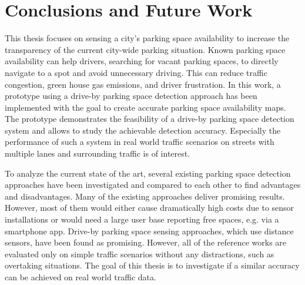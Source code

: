 \chapter{Conclusions and Future Work}
\label{chap:conclusion}



This thesis focuses on sensing a city's parking space availability to increase the transparency of the current city-wide parking situation. 
Known parking space availability can help drivers, searching for vacant parking spaces, to directly navigate to a spot and avoid unnecessary driving. This can reduce traffic congestion, green house gas emissions, and driver frustration. 
In this work, a prototype using a drive-by parking space detection approach has been implemented with the goal to create accurate parking space availability maps. The prototype demonstrates the feasibility of a drive-by parking space detection system and allows to study the achievable detection accuracy. Especially the performance of such a system in real world traffic scenarios on streets with multiple lanes and surrounding traffic is of interest.

To analyze the current state of the art, several existing parking space detection approaches have been investigated and compared to each other to find advantages and disadvantages.
Many of the existing approaches deliver promising results. However, most of them would either cause dramatically high costs due to sensor installations or would need a large user base reporting free spaces, e.g. via a smartphone app.
Drive-by parking space sensing approaches, which use distance sensors, have been found as promising. However, all of the reference works are evaluated only on simple traffic scenarios without any distractions, such as overtaking situations. 
The goal of this thesis is to investigate if a similar accuracy can be achieved on real world traffic data.

